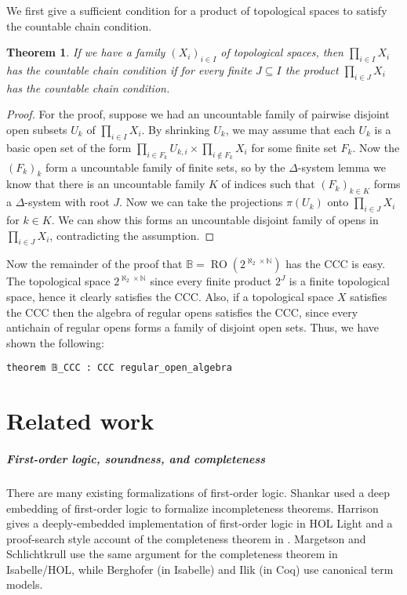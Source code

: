 \documentclass[a4paper,USenglish,cleveref, autoref]{lipics-v2019}
\newcommand{\B}{\mathbb{B}}
\theoremstyle{theorem}
\newtheorem{thm}[theorem]{Theorem}
\theoremstyle{definition}
\begin{document}
We first give a sufficient condition for a product of topological spaces to satisfy the countable chain condition.
\begin{thm}
If we have a family $(X_i)_{i\in I}$ of topological spaces, then $\prod_{i\in I} X_i$ has the countable chain condition if for every finite $J\subseteq I$ the product $\prod_{i\in J} X_i$ has the countable chain condition.
\end{thm}
\begin{proof}
For the proof, suppose we had an uncountable family of pairwise disjoint open subsets $U_k$ of $\prod_{i\in I} X_i$. By shrinking $U_k$, we may assume that each $U_k$ is a basic open set of the form $\prod_{i\in F_k} U_{k,i} \times \prod_{i \not\in F_k} X_i$ for some finite set $F_k$. Now the $(F_k)_k$ form a uncountable family of finite sets, so by the $\Delta$-system lemma we know that there is an uncountable family $K$ of indices such that $(F_k)_{k\in K}$ forms a $\Delta$-system with root $J$. Now we can take the projections $\pi(U_k)$ onto $\prod_{i\in J}X_i$ for $k\in K$. We can show this forms an uncountable disjoint family of opens in $\prod_{i\in J}X_i$, contradicting the assumption.
\end{proof}

Now the remainder of the proof that $\B=\operatorname{RO}(2^{\aleph_2 \times \mathbb{N}})$ has the CCC is easy. The topological space $2^{\aleph_2 \times \mathbb{N}}$ since every finite product $2^J$ is a finite topological space, hence it clearly satisfies the CCC. Also, if a topological space $X$ satisfies the CCC then the algebra of regular opens satisfies the CCC, since every antichain of regular opens forms a family of disjoint open sets. Thus, we have shown the following:
\begin{lstlisting}
theorem 𝔹_CCC : CCC regular_open_algebra
\end{lstlisting}

\section{Related work}
\subparagraph*{First-order logic, soundness, and completeness} There are many existing formalizations of first-order logic. Shankar \cite{shankar1997metamathematics} used a deep embedding of first-order logic to formalize incompleteness theorems. Harrison gives a deeply-embedded implementation of first-order logic in HOL Light \cite{harrison1998formalizing} and a proof-search style account of the completeness theorem in \cite{harrison2009handbook}. Margetson \cite{Ridge2005AMV} and Schlichtkrull \cite{schlichtkrull2018formalization} use the same argument for the completeness theorem in Isabelle/HOL, while Berghofer \cite{FOL-Fitting-AFP} (in Isabelle) and Ilik \cite {ilik2010constructive} (in Coq) use canonical term models.
\end{document}
